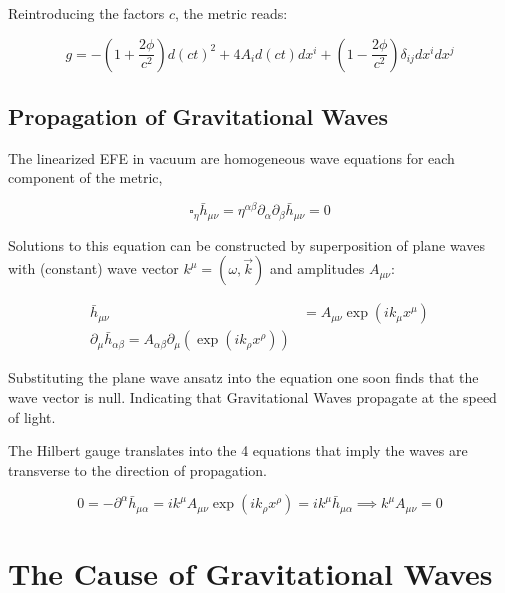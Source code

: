 Reintroducing the factors $c$, the metric reads:

\begin{equation}
    \label{eq:metric-no-stresses-source-complete}
    g = -\left( 1+\frac{2\phi}{c^2} \right)d(ct)^2 + 4A_i d(ct)dx^i +\left( 1-\frac{2\phi}{c^2} \right)\delta_{ij}dx^i dx^j
\end{equation}

\subsection{Propagation of Gravitational Waves}\label{subsec:propagation-of-gravitational-waves}
The linearized EFE in vacuum are homogeneous wave equations for each component of the metric,

\begin{equation}
    \label{eq:homogeneous-wave-equations-for-metric}
    \square_{\eta}\bar h_{\mu\nu} = \eta^{\alpha\beta}\partial_{\alpha}\partial_{\beta}\bar h_{\mu\nu} = 0
\end{equation}

Solutions to this equation can be constructed by superposition of plane waves with (constant) wave vector $k^\mu = (\omega, \vec k)$ and amplitudes $A_{\mu\nu}$:

\begin{align}
    \bar h_{\mu\nu} &= A_{\mu\nu} \exp\left( i k_\mu x^\mu \right)\\
    \partial_{\mu} \bar h_{\alpha\beta} = A_{\alpha\beta}\partial_{\mu}(\exp\left( ik_\rho x^\rho\right))
\end{align}

Substituting the plane wave ansatz into the equation one soon finds that the wave vector is null.
Indicating that Gravitational Waves propagate at the speed of light.

The Hilbert gauge translates into the 4 equations that imply the waves are transverse to the direction of propagation.

\begin{equation}
    \label{eq:transverse-to-direction-propagation}
    0 = -\partial^{\alpha}\bar h_{\mu\alpha} = ik^{\mu} A_{\mu\nu}\exp\left(
    i k_{\rho}x^{\rho}
    \right) = ik^{\mu}\bar h_{\mu\alpha} \implies k^{\mu} A_{\mu\nu} =0
\end{equation}

\section{The Cause of Gravitational Waves}\label{sec:the-cause-of-gravitational-waves}
